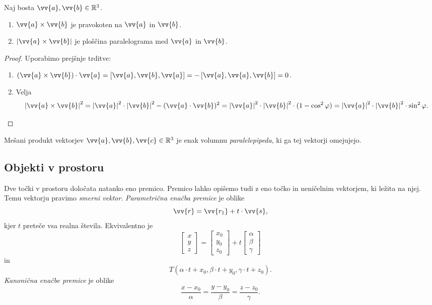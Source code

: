 \documentclass[12pt, a4paper]{article}
\begin{document}
\begin{trditev}
Naj bosta $\vv{a},\vv{b}\in\R^3$.

\begin{enumerate}[label=\roman*)]
\item $\vv{a}\times\vv{b}$ je pravokoten na $\vv{a}$ in $\vv{b}$.
\item $\left|\vv{a}\times\vv{b}\right|$ je ploščina paralelograma med $\vv{a}$ in $\vv{b}$.
\end{enumerate}
\end{trditev}

\begin{proof}
Uporabimo prejšnje trditve:

\begin{enumerate}[label=\roman*)]
\item $(\vv{a}\times\vv{b})\cdot\vv{a}=\left[\vv{a},\vv{b},\vv{a}\right]=-\left[\vv{a},\vv{a},\vv{b}\right]=0$.
\item Velja
\[
\left|\vv{a}\times\vv{b}\right|^2
=\left|\vv{a}\right|^2\cdot\left|\vv{b}\right|^2-(\vv{a}\cdot\vv{b})^2
=\left|\vv{a}\right|^2\cdot\left|\vv{b}\right|^2\cdot(1-\cos^2\varphi)
=\left|\vv{a}\right|^2\cdot\left|\vv{b}\right|^2\cdot\sin^2\varphi.\qedhere
\]
\end{enumerate}
\end{proof}

\begin{trditev}
Mešani produkt vektorjev $\vv{a},\vv{b},\vv{c}\in\R^3$ je enak volumnu \emph{paralelepipeda}, ki ga tej vektorji omejujejo.
\end{trditev}

\newpage

\subsection{Objekti v prostoru}

Dve točki v prostoru določata natanko eno premico. Premico lahko opišemo tudi z eno točko in neničelnim vektorjem, ki ležita na njej. Temu vektorju pravimo \emph{smerni vektor}. \emph{Parametrična enačba premice} je oblike
\[
\vv{r}=\vv{r_1}+t\cdot\vv{s},
\]
kjer $t$ preteče vsa realna števila. Ekvivalentno je
\[
\begin{bmatrix}
x \\
y \\
z
\end{bmatrix}
=
\begin{bmatrix}
x_0 \\
y_0 \\
z_0
\end{bmatrix}
+t\begin{bmatrix}
\alpha \\
\beta \\
\gamma
\end{bmatrix}
\]
in
\[
T(\alpha\cdot t+x_0,\beta\cdot t+y_0,\gamma\cdot t+z_0).
\]
\emph{Kanonična enačbe premice} je oblike
\[
\frac{x-x_0}{\alpha}=\frac{y-y_0}{\beta}=\frac{z-z_0}{\gamma}.
\]
\end{document}
